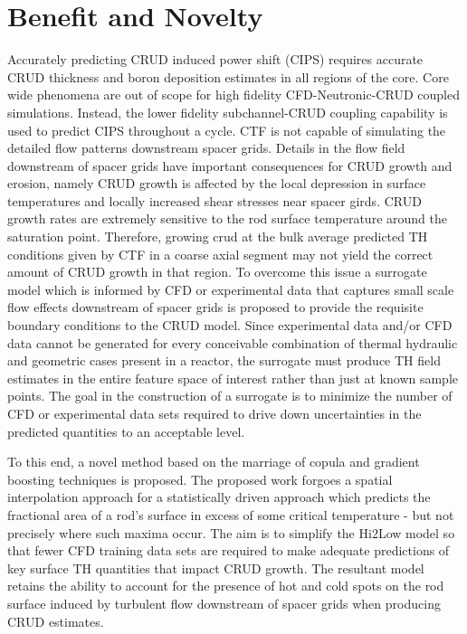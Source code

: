 \section{Benefit and Novelty}

Accurately predicting CRUD induced power shift (CIPS) requires accurate CRUD
thickness and boron deposition estimates in all regions of the core.  Core wide
phenomena are out of scope for high fidelity CFD-Neutronic-CRUD coupled
simulations.  Instead, the lower fidelity subchannel-CRUD coupling capability is used to
predict CIPS throughout a cycle.  CTF is not capable of simulating the detailed
flow patterns downstream spacer grids.  Details in the flow field
downstream of spacer grids have important consequences for CRUD growth and
erosion, namely CRUD growth is affected by the local depression in surface temperatures and locally
increased shear stresses near spacer girds.  CRUD growth rates are extremely sensitive to the rod surface
temperature around the saturation point.  Therefore, growing crud at the bulk
average predicted TH conditions given by CTF in a coarse axial segment may not
yield the correct amount of CRUD growth in that region.  To overcome this issue
a surrogate model which is informed by CFD or experimental data that captures
small scale flow effects downstream of spacer grids is proposed to provide the requisite
boundary conditions to the CRUD model.  Since experimental data and/or CFD data
cannot be generated for every conceivable combination of thermal hydraulic and
geometric cases present in a reactor, the surrogate must produce
TH field estimates in the entire feature space of interest rather than just at known
sample points.  The goal in the construction of a surrogate is to minimize the
number of CFD or experimental data sets required to drive down uncertainties in
the predicted quantities to an acceptable level.

To this end, a novel method based on the marriage of copula and gradient
boosting techniques is proposed.  The proposed work forgoes a spatial
interpolation approach for a statistically driven approach which predicts the
fractional area of a rod's surface in excess of some critical temperature - but
not precisely where such maxima occur.  The aim is to simplify the Hi2Low model
so that fewer CFD training data sets are required to make adequate predictions
of key surface TH quantities that impact CRUD growth.  The resultant model
retains the ability to account for the presence of hot and cold spots on the rod surface induced by
turbulent flow downstream of spacer grids when producing CRUD estimates.

